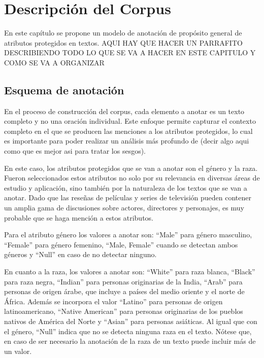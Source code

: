 \chapter{Descripci\'on del Corpus}\label{chapter:proposal}
En este cap\'itulo se propone un modelo de anotaci\'on de prop\'osito general de atributos protegidos
en textos. 
AQUI HAY QUE HACER UN PARRAFITO DESCRIBIENDO TODO LO QUE SE VA A HACER EN ESTE CAPITULO Y COMO SE VA A ORGANIZAR

\section{Esquema de anotaci\'on}
En el proceso de construcci\'on del corpus, cada elemento a anotar es un texto completo y no una oraci\'on individual. 
Este enfoque permite capturar el contexto completo en el que se producen las menciones a los atributos protegidos, 
lo cual es importante para poder realizar un an\'alisis m\'as profundo de (decir algo aqui como que es mejor asi para tratar los sesgos).

En este caso, los atributos protegidos que se van a anotar son el g\'enero y la raza.
Fueron seleccionados estos atributos no solo por su relevancia en diversas \'areas de estudio y aplicaci\'on, sino tambi\'en 
por la naturaleza de los textos que se van a anotar. Dado que las rese\~nas de pel\'iculas y series de televisi\'on
pueden contener un amplia gama de discusiones sobre actores, directores y personajes, es muy probable que se haga menci\'on a 
estos atributos.

Para el atributo g\'enero los valores a anotar son: ``Male'' para g\'enero masculino, ``Female'' para g\'enero femenino, 
``Male, Female'' cuando se detectan ambos g\'eneros y ``Null'' en caso de no detectar ninguno.

En cuanto a la raza, los valores a anotar son: ``White'' para raza blanca, ``Black'' para raza negra, ``Indian'' para 
personas originarias de la India, ``Arab'' para personas de origen \'arabe, que incluye a pa\'ises del medio oriente y el norte de 
\'Africa. Adem\'as se incorpora el valor ``Latino'' para personas de origen latinoamericano, ``Native American'' para personas 
originarias de los pueblos nativos de Am\'erica del Norte y ``Asian'' para personas asi\'aticas. Al igual que con el g\'enero, 
``Null'' indica que no se detecta ninguna raza en el texto. N\'otese que, en caso de ser necesario la anotaci\'on de la raza de un 
texto puede incluir m\'as de un valor.

